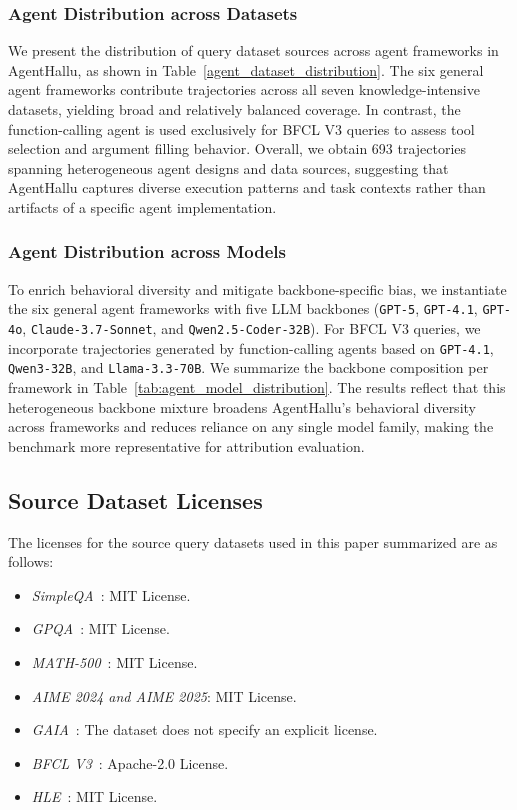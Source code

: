 

\subsubsection{Agent Distribution across Datasets}
We present the distribution of query dataset sources across agent frameworks in AgentHallu, as shown in Table~\ref{agent_dataset_distribution}. The six general agent frameworks contribute trajectories across all seven knowledge-intensive datasets, yielding broad and relatively balanced coverage. In contrast, the function-calling agent is used exclusively for BFCL V3 queries to assess tool selection and argument filling behavior. Overall, we obtain 693 trajectories spanning heterogeneous agent designs and data sources, suggesting that AgentHallu captures diverse execution patterns and task contexts rather than artifacts of a specific agent implementation.



\subsubsection{Agent Distribution across Models}
To enrich behavioral diversity and mitigate backbone-specific bias, we instantiate the six general agent frameworks with five LLM backbones (\texttt{GPT-5}, \texttt{GPT-4.1}, \texttt{GPT-4o}, \texttt{Claude-3.7-Sonnet}, and \texttt{Qwen2.5-Coder-32B}). For BFCL V3 queries, we incorporate trajectories generated by function-calling agents based on \texttt{GPT-4.1}, \texttt{Qwen3-32B}, and \texttt{Llama-3.3-70B}. We summarize the backbone composition per framework in Table~\ref{tab:agent_model_distribution}. The results reflect that this heterogeneous backbone mixture broadens AgentHallu’s behavioral diversity across frameworks and reduces reliance on any single model family, making the benchmark more representative for attribution evaluation.

\subsection{Source Dataset Licenses}
The licenses for the source query datasets used in this paper summarized are as follows:
\begin{itemize}[noitemsep,left=2pt, itemsep=0pt, topsep=0pt]
    \item \textit{SimpleQA}~\cite{wei2024measuring}: MIT License.
    \item \textit{GPQA}~\cite{rein2024gpqa}: MIT License.
    \item \textit{MATH-500}~\cite{hendrycks2021measuring}: MIT License. 
    \item \textit{AIME 2024 and AIME 2025}: MIT License. 
    \item \textit{GAIA}~\cite{mialon2023gaia}: The dataset does not specify an explicit license.
    \item \textit{BFCL V3}~\cite{patilberkeley}: Apache-2.0 License.
    \item \textit{HLE}~\cite{phan2025humanity}: MIT License.
\end{itemize}

